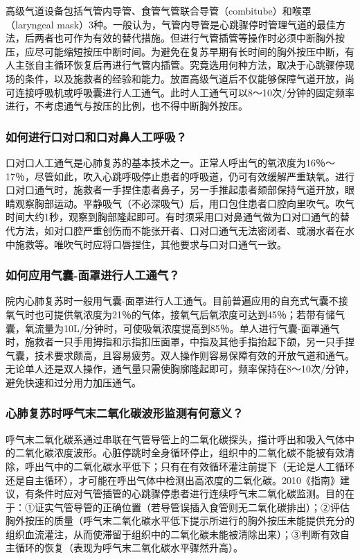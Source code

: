 高级气道设备包括气管内导管、食管气管联合导管（combitube）和喉罩（laryngeal
mask）3种。一般认为，气管内导管是心跳骤停时管理气道的最佳方法，后两者也可作为有效的替代措施。但进行气管插管等操作时必须中断胸外按压，应尽可能缩短按压中断时间。为避免在复苏早期有长时间的胸外按压中断，有人主张自主循环恢复后再进行气管内插管。究竟选用何种方法，取决于心跳骤停现场的条件，以及施救者的经验和能力。放置高级气道后不仅能够保障气道开放，尚可连接呼吸机或呼吸囊进行人工通气。此时人工通气可以8～10次/分钟的固定频率进行，不考虑通气与按压的比例，也不得中断胸外按压。

\subsubsection{如何进行口对口和口对鼻人工呼吸？}

口对口人工通气是心肺复苏的基本技术之一。正常人呼出气的氧浓度为16％～17％，尽管如此，吹入心跳呼吸停止患者的呼吸道，仍可有效缓解严重缺氧。进行口对口通气时，施救者一手捏住患者鼻子，另一手推起患者颏部保持气道开放，眼睛观察胸部运动。平静吸气（不必深吸气）后，用口包住患者口腔向里吹气。吹气时间大约1秒，观察到胸部隆起即可。有时须采用口对鼻通气做为口对口通气的替代方法，如对口腔严重创伤而不能张开者、口对口通气无法密闭者、或溺水者在水中施救等。唯吹气时应将口唇捏住，其他要求与口对口通气一致。

\subsubsection{如何应用气囊-面罩进行人工通气？}

院内心肺复苏时一般用气囊-面罩进行人工通气。目前普遍应用的自充式气囊不接氧气时也可提供氧浓度为21％的气体，接氧气后氧浓度可达到45％；若带有储气囊，氧流量为10L/分钟时，可使吸氧浓度提高到85％。单人进行气囊-面罩通气时，施救者一只手用拇指和示指扣压面罩，中指及其他手指抬起下颌，另一只手捏气囊，技术要求颇高，且容易疲劳。双人操作则容易保障有效的开放气道和通气。无论单人还是双人操作，通气量只需使胸廓隆起即可，频率保持在8～10次/分钟，避免快速和过分用力加压通气。

\subsubsection{心肺复苏时呼气末二氧化碳波形监测有何意义？}

呼气末二氧化碳系通过串联在气管导管上的二氧化碳探头，描计呼出和吸入气体中的二氧化碳浓度波形。心脏停跳时全身循环停止，组织中的二氧化碳不能被有效清除，呼出气中的二氧化碳水平低下；只有在有效循环灌注前提下（无论是人工循环还是自主循环），才可能在呼出气体中检测出高浓度的二氧化碳。2010《指南》建议，有条件时应对气管插管的心跳骤停患者进行连续呼气末二氧化碳监测。目的在于：①证实气管导管的正确位置（若导管误插入食管则无二氧化碳排出）；②评估胸外按压的质量（呼气末二氧化碳水平低下提示所进行的胸外按压未能提供充分的组织血流灌注，从而使滞留于组织中的二氧化碳未能被清除出来）；③判断有效自主循环的恢复（表现为呼气末二氧化碳水平骤然升高）。

